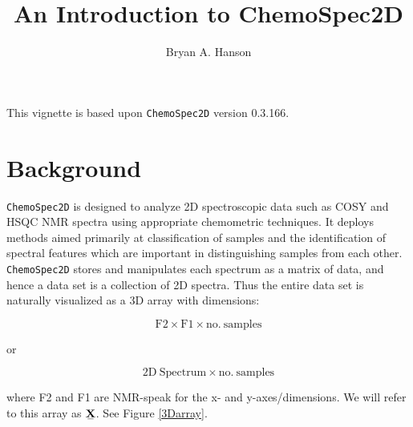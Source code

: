 \documentclass[letter,10pt,twocolumn,twoside,printwatermark=false]{pinp}
\title{An Introduction to ChemoSpec2D}
\author[a]{Bryan A. Hanson}
\affil[a]{Dept. of Chemistry \& Biochemistry, DePauw University;
\url{hanson@depauw.edu}}
\begin{document}
\verticaladjustment{-2pt}

\maketitle
\thispagestyle{firststyle}



\newcommand\ubar[1]{\stackunder[1.2pt]{$#1$}{\rule{1.2ex}{.075ex}}}

This vignette is based upon \texttt{ChemoSpec2D} version 0.3.166.

\hypertarget{background}{%
\section{Background}\label{background}}

\texttt{ChemoSpec2D} is designed to analyze 2D spectroscopic data such
as COSY and HSQC NMR spectra using appropriate chemometric techniques.
It deploys methods aimed primarily at classification of samples and the
identification of spectral features which are important in
distinguishing samples from each other. \texttt{ChemoSpec2D} stores and
manipulates each spectrum as a matrix of data, and hence a data set is a
collection of 2D spectra. Thus the entire data set is naturally
visualized as a 3D array with dimensions:

\[
\mathrm{F2} \times \mathrm{F1} \times \mathrm{no. \ samples}
\]

or

\[
\mathrm{2D \ Spectrum} \times \mathrm{no. \ samples}
\]

where F2 and F1 are NMR-speak for the x- and y-axes/dimensions. We will
refer to this array as
\(\stackunder[1.2pt]{$\mathbf{X}$}{\rule{1.2ex}{.075ex}}\). See Figure
\ref{3Darray}.
\end{document}
